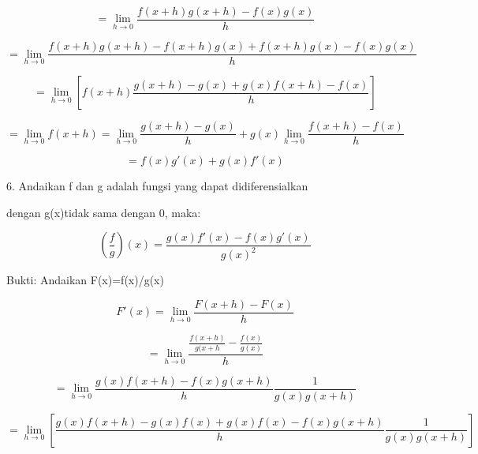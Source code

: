 \documentclass[a4paper,10pt]{article}
\begin{document}
\begin{eulernotebook}
\begin{eulercomment}
\begin{eulercomment}
\begin{eulercomment}
\begin{eulercomment}
\begin{eulercomment}
\begin{eulercomment}
\begin{eulercomment}
\begin{eulercomment}
\begin{eulercomment}
\begin{eulercomment}
\begin{eulercomment}
\begin{eulercomment}
\begin{eulercomment}
\begin{eulercomment}
\begin{eulercomment}
\begin{eulercomment}
\begin{eulercomment}
\begin{eulercomment}
\begin{eulercomment}
\begin{eulercomment}
\begin{eulerformula}
\end{eulerformula}
\begin{eulerformula}
\[
= \lim_{h\to 0}\frac{f(x+h)g(x+h)-f(x)g(x)}{h}
\]
\end{eulerformula}
\begin{eulerformula}
\[
= \lim_{h\to 0}\frac{f(x+h)g(x+h)-f(x+h)g(x)+f(x+h)g(x)-f(x)g(x)}{h}
\]
\end{eulerformula}
\begin{eulerformula}
\[
=\lim_{h\to 0}[f(x+h)\frac{g(x+h)-g(x)+g(x)f(x+h)-f(x)}{h}]
\]
\end{eulerformula}
\begin{eulerformula}
\[
=\lim_{h\to 0} f(x+h)=\lim_{h \to 0}\frac{g(x+h)-g(x)}{h}+g(x)\lim_{h\to 0}\frac{f(x+h)-f(x)}{h}
\]
\end{eulerformula}
\begin{eulerformula}
\[
=f(x)g'(x)+g(x)f'(x)
\]
\end{eulerformula}
\begin{eulercomment}
6. Andaikan f dan g adalah fungsi yang dapat didiferensialkan\\
\end{eulercomment}
\begin{eulerttcomment}
   dengan g(x)tidak sama dengan 0, maka:
\end{eulerttcomment}
\begin{eulerformula}
\[
(\frac{f}{g})(x)=\frac{g(x)f'(x)-f(x)g'(x)}{g(x)^2}
\]
\end{eulerformula}
\begin{eulerttcomment}
   Bukti:
   Andaikan F(x)=f(x)/g(x)
\end{eulerttcomment}
\begin{eulerformula}
\[
F'(x)= \lim_{h\to 0}\frac{F(x+h)-F(x)}{h}
\]
\end{eulerformula}
\begin{eulerformula}
\[
= \lim_{h\to 0}\frac{\frac{f(x+h)}{g(x+h}-\frac{f(x)}{g(x)}}{h}
\]
\end{eulerformula}
\begin{eulerformula}
\[
= \lim_{h\to 0}\frac{g(x)f(x+h)-f(x)g(x+h)}{h}\frac{1}{g(x)g(x+h)}
\]
\end{eulerformula}
\begin{eulerformula}
\[
= \lim_{h\to 0}[\frac{g(x)f(x+h)-g(x)f(x)+g(x)f(x)-f(x)g(x+h)}{h}\frac{1}{g(x)g(x+h)}]
\]
\end{eulerformula}

\end{eulercomment}
\end{eulercomment}
\end{eulercomment}
\end{eulercomment}
\end{eulercomment}
\end{eulercomment}
\end{eulercomment}
\end{eulercomment}
\end{eulercomment}
\end{eulercomment}
\end{eulercomment}
\end{eulercomment}
\end{eulercomment}
\end{eulercomment}
\end{eulercomment}
\end{eulercomment}
\end{eulercomment}
\end{eulercomment}
\end{eulercomment}
\end{eulercomment}
\end{eulernotebook}
\end{document}
